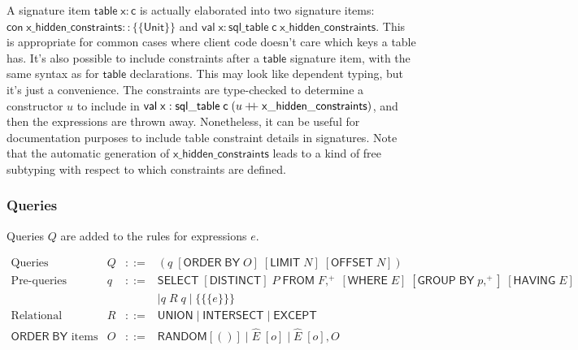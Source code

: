 \documentclass{article}
\newcommand{\mt}[1]{\mathsf{#1}}
\newcommand{\rc}{+ \hspace{-.075in} + \;}
\begin{document}
A signature item $\mt{table} \; \mt{x} : \mt{c}$ is actually elaborated into two signature items: $\mt{con} \; \mt{x\_hidden\_constraints} :: \{\{\mt{Unit}\}\}$ and $\mt{val} \; \mt{x} : \mt{sql\_table} \; \mt{c} \; \mt{x\_hidden\_constraints}$.  This is appropriate for common cases where client code doesn't care which keys a table has.  It's also possible to include constraints after a $\mt{table}$ signature item, with the same syntax as for $\mt{table}$ declarations.  This may look like dependent typing, but it's just a convenience.  The constraints are type-checked to determine a constructor $u$ to include in $\mt{val} \; \mt{x} : \mt{sql\_table} \; \mt{c} \; (u \rc \mt{x\_hidden\_constraints})$, and then the expressions are thrown away.  Nonetheless, it can be useful for documentation purposes to include table constraint details in signatures.  Note that the automatic generation of $\mt{x\_hidden\_constraints}$ leads to a kind of free subtyping with respect to which constraints are defined.


\subsubsection{Queries}

Queries $Q$ are added to the rules for expressions $e$.

$$\begin{array}{rrcll}
  \textrm{Queries} & Q &::=& (q \; [\mt{ORDER} \; \mt{BY} \; O] \; [\mt{LIMIT} \; N] \; [\mt{OFFSET} \; N]) \\
  \textrm{Pre-queries} & q &::=& \mt{SELECT} \; [\mt{DISTINCT}] \; P \; \mt{FROM} \; F,^+ \; [\mt{WHERE} \; E] \; [\mt{GROUP} \; \mt{BY} \; p,^+] \; [\mt{HAVING} \; E] \\
  &&& \mid q \; R \; q \mid \{\{\{e\}\}\} \\
  \textrm{Relational operators} & R &::=& \mt{UNION} \mid \mt{INTERSECT} \mid \mt{EXCEPT} \\
  \textrm{$\mt{ORDER \; BY}$ items} & O &::=& \mt{RANDOM} [()] \mid \hat{E} \; [o] \mid \hat{E} \; [o], O
\end{array}$$
\end{document}

